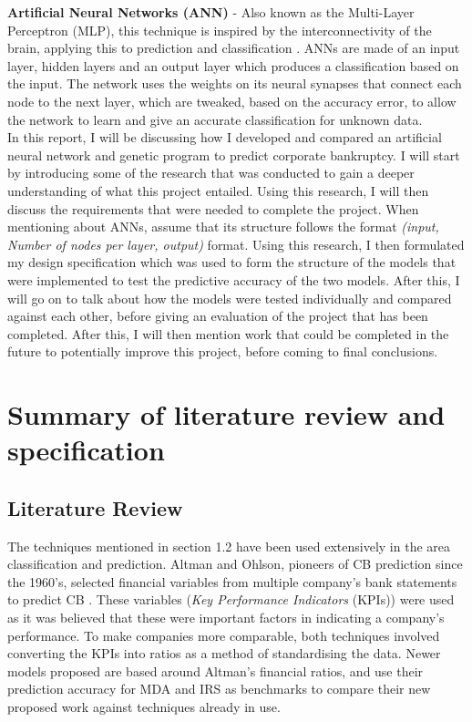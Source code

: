 \documentclass[11pt]{article}
\begin{document}
\textbf{Artificial Neural Networks (ANN)} - Also known as the Multi-Layer Perceptron (MLP),  this technique is inspired by the interconnectivity of the brain, applying this to prediction and classification \cite{ref-seven}. ANNs are made of an input layer, hidden layers and an output layer which produces a classification based on the input. The network uses the weights on its neural synapses that connect each node to the next layer, which are tweaked, based on the accuracy error, to allow the network to learn and give an accurate classification for unknown data. 
\\

In this report, I will be discussing how I developed and compared an artificial neural network and genetic program to predict corporate bankruptcy.  I will start by introducing some of the research that was conducted to gain a deeper understanding of what this project entailed. Using this research, I will then discuss the requirements that were needed to complete the project. When mentioning about ANNs, assume that its structure follows the format \textit{(input, Number of nodes per layer, output)} format. Using this research, I then formulated my design specification which was used to form the structure of the models that were implemented to test the predictive accuracy of the two models. After this, I will go on to talk about how the models were tested individually and compared against each other, before giving an evaluation of the project that has been completed. After this, I will then mention work that could be completed in the future to potentially improve this project, before coming to final conclusions. 
\section{Summary of literature review and specification}\label{sec:spec}
\subsection{Literature Review}\label{subsec:litrev}
The techniques mentioned in section 1.2 have been used extensively in the area classification and prediction. Altman and Ohlson, pioneers of CB prediction since the 1960's, selected financial variables from multiple company's bank statements to predict CB \cite{ref-six,ref-eight}. These variables (\textit{Key Performance Indicators} (KPIs)) were used as it was believed that these were important factors in indicating a company's performance. To make companies more comparable, both techniques involved converting the KPIs into ratios as a method of standardising the data. Newer models proposed are based around Altman's financial ratios, and use their prediction accuracy for MDA and IRS as benchmarks to compare their new proposed work against techniques already in use. 
\end{document}
